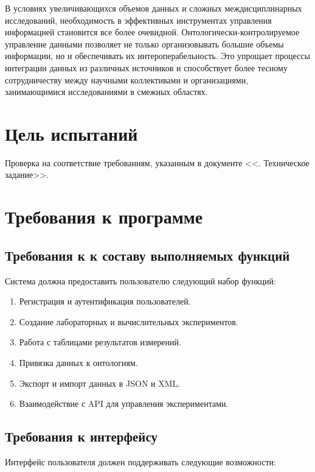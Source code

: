 \documentclass[a4paper,12pt,reqno]{article}
\begin{document}
    В условиях увеличивающихся объемов данных и сложных междисциплинарных исследований, необходимость в эффективных инструментах управления информацией становится все более очевидной. Онтологически-контролируемое управление данными позволяет не только организовывать большие объемы информации, но и обеспечивать их интероперабельность. Это упрощает процессы интеграции данных из различных источников и способствует более тесному сотрудничеству между научными коллективами и организациями, занимающимися исследованиями в смежных областях.
    \newpage

    \section{Цель испытаний}
    Проверка на соответствие требованиям, указанным в документе <<\unskip. Техническое задание>>.

    \section{Требования к программе}

    \subsection{Требования к к составу выполняемых функций}

    Система должна предоставить пользователю следующий набор функций:

    \begin{enumerate}
        \item Регистрация и аутентификация пользователей.
        \item Создание лабораторных и вычислительных экспериментов.
        \item Работа с таблицами результатов измерений.
        \item Привязка данных к онтологиям.
        \item Экспорт и импорт данных в JSON и XML.
        \item Взаимодействие с API для управления экспериментами.
    \end{enumerate}

    \subsection{Требования к интерфейсу}

    Интерфейс пользователя должен поддерживать следующие возможности:
    
\end{document}
